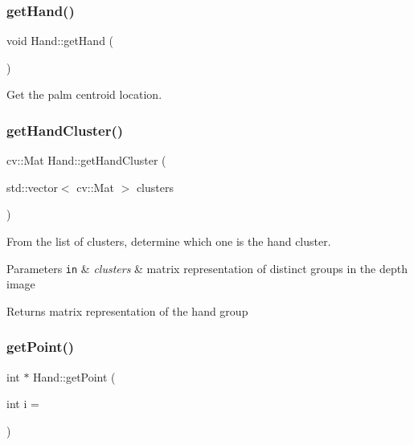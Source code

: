 \subsubsection{\texorpdfstring{get\+Hand()}{getHand()}}
{\footnotesize\ttfamily void Hand\+::get\+Hand (\begin{DoxyParamCaption}{ }\end{DoxyParamCaption})\hspace{0.3cm}{\ttfamily [protected]}}



Get the palm centroid location. 

\hypertarget{class_hand_aa3ada30b516302dbabe5813f8eb6ac1a}{}\label{class_hand_aa3ada30b516302dbabe5813f8eb6ac1a} 
\subsubsection{\texorpdfstring{get\+Hand\+Cluster()}{getHandCluster()}}
{\footnotesize\ttfamily cv\+::\+Mat Hand\+::get\+Hand\+Cluster (\begin{DoxyParamCaption}\item[{std\+::vector$<$ cv\+::\+Mat $>$}]{clusters }\end{DoxyParamCaption})\hspace{0.3cm}{\ttfamily [static]}}



From the list of clusters, determine which one is the hand cluster. 


\begin{DoxyParams}[1]{Parameters}
\mbox{\tt in}  & {\em clusters} & matrix representation of distinct groups in the depth image \\
\hline
\end{DoxyParams}
\begin{DoxyReturn}{Returns}
matrix representation of the hand group 
\end{DoxyReturn}
\hypertarget{class_hand_a0d6fb9c0c195ef544e36e6dfe6621bbb}{}\label{class_hand_a0d6fb9c0c195ef544e36e6dfe6621bbb} 
\subsubsection{\texorpdfstring{get\+Point()}{getPoint()}}
{\footnotesize\ttfamily int $\ast$ Hand\+::get\+Point (\begin{DoxyParamCaption}\item[{int}]{i = {} }\end{DoxyParamCaption})\hspace{0.3cm}{\ttfamily [protected]}}




